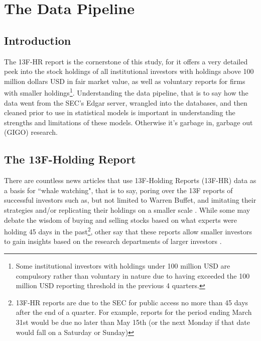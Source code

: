\chapter{The Data Pipeline}
\label{ChapterIII}
\nocite{rgdal}
\section{Introduction}


The 13F-HR report is the cornerstone of this study, for it offers a very detailed peek into the stock holdings of all institutional investors with holdings above 100 million dollars USD in fair market value, as well as voluntary reports for firms with smaller holdings\footnote{Some institutional investors with holdings under 100 million USD are compulsory rather than voluntary in nature due to having exceeded the 100 million USD reporting threshold in the previous 4 quarters.}.  Understanding the data pipeline, that is to say how the data went from the SEC's Edgar server, wrangled into the databases, and then cleaned prior to use in statistical models is important in understanding the strengths and limitations of these models.  Otherwise it's garbage in, garbage out (GIGO) research.  

\section{The 13F-Holding Report}

There are countless news articles that use 13F-Holding Reports (13F-HR) data as a basis for ``whale watching", that is to say, poring over the 13F reports of successful investors such as, but not limited to Warren Buffet, and imitating their strategies and/or replicating their holdings on a smaller scale \citep{Whale_Watching_CNBC_12}.  While some may debate the wisdom of buying and selling stocks based on what experts were holding 45 days in the past\footnote{13F-HR reports are due to the SEC for public access no more than 45 days after the end of a quarter.  For example, reports for the period ending March 31st would be due no later than May 15th (or the next Monday if that date would fall on a Saturday or Sunday)}, other say that these reports allow smaller investors to gain insights based on the research departments of larger investors \citep{WhaleReport13}.  

